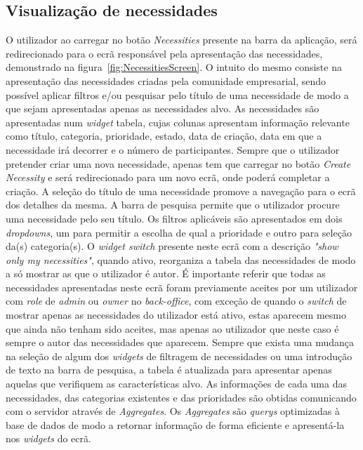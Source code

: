 \subsection{Visualização de necessidades}\label{subsec:implementacao:necessities}
O utilizador ao carregar no botão \textit{Necessities} presente na barra da aplicação, será redirecionado para o ecrã responsável pela apresentação das necessidades, demonstrado na figura~\ref{fig:NecessitiesScreen}. 
O intuito do mesmo consiste na apresentação das necessidades criadas pela comunidade empresarial, sendo possível aplicar filtros e/ou pesquisar pelo título de uma necessidade de modo a que sejam apresentadas apenas as necessidades alvo.
As necessidades são apresentadas num \textit{widget} tabela, cujas colunas apresentam informação relevante como título, categoria, prioridade, estado, data de criação, data em que a necessidade irá decorrer e o número de participantes. 
Sempre que o utilizador pretender criar uma nova necessidade, apenas tem que carregar no botão \textit{Create Necessity} e será redirecionado para um novo ecrã, onde poderá completar a criação.
A seleção do título de uma necessidade promove a navegação para o ecrã dos detalhes da mesma.
A barra de pesquisa permite que o utilizador procure uma necessidade pelo seu título.
Os filtros aplicáveis são apresentados em dois \textit{dropdowns}, um para permitir a escolha de qual a prioridade e outro para seleção da(s) categoria(s).
O \textit{ widget switch} presente neste ecrã com a descrição \textit{"show only my necessities"}, quando ativo, reorganiza a tabela das necessidades de modo a só mostrar as que o utilizador é autor.
É importante referir que todas as necessidades apresentadas neste ecrã foram previamente aceites por um utilizador com \textit{role} de \textit{admin} ou \textit{owner} no \textit{back-office}, com exceção de quando o \textit{switch} de mostrar apenas as necessidades do utilizador está ativo, estas aparecem mesmo que ainda não tenham sido aceites, mas apenas ao utilizador que neste caso é sempre o autor das necessidades que aparecem. 
Sempre que exista uma mudança na seleção de algum dos \textit{widgets} de filtragem de necessidades ou uma introdução de texto na barra de pesquisa, a tabela é atualizada para apresentar apenas aquelas que verifiquem as características alvo. 
As informações de cada uma das necessidades, das categorias existentes e das prioridades são obtidas comunicando com o servidor através de \textit{Aggregates}. 
Os \textit{Aggregates} são \textit{querys} optimizadas à base de dados de modo a retornar informação de forma eficiente e apresentá-la nos \textit{widgets} do ecrã.

